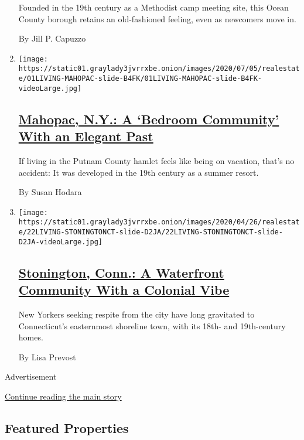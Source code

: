 \begin{enumerate}
  Founded in the 19th century as a Methodist camp meeting site, this
  Ocean County borough retains an old-fashioned feeling, even as
  newcomers move in.

  By Jill P. Capuzzo
\item
  \texttt{[image: https://static01.graylady3jvrrxbe.onion/images/2020/07/05/realestate/01LIVING-MAHOPAC-slide-B4FK/01LIVING-MAHOPAC-slide-B4FK-videoLarge.jpg]}

  \hypertarget{mahopac-ny-a-bedroom-community-with-an-elegant-past}{%
  \subsection{\texorpdfstring{\href{/2020/07/01/realestate/mahopac-ny-a-bedroom-community-with-an-elegant-past.html}{Mahopac,
  N.Y.: A `Bedroom Community' With an Elegant
  Past}}{Mahopac, N.Y.: A `Bedroom Community' With an Elegant Past}}\label{mahopac-ny-a-bedroom-community-with-an-elegant-past}}

  If living in the Putnam County hamlet feels like being on vacation,
  that's no accident: It was developed in the 19th century as a summer
  resort.

  By Susan Hodara
\item
  \texttt{[image: https://static01.graylady3jvrrxbe.onion/images/2020/04/26/realestate/22LIVING-STONINGTONCT-slide-D2JA/22LIVING-STONINGTONCT-slide-D2JA-videoLarge.jpg]}

  \hypertarget{stonington-conn-a-waterfront-community-with-a-colonial-vibe}{%
  \subsection{\texorpdfstring{\href{/2020/04/22/realestate/stonington-conn-a-waterfront-community-with-a-colonial-vibe.html}{Stonington,
  Conn.: A Waterfront Community With a Colonial
  Vibe}}{Stonington, Conn.: A Waterfront Community With a Colonial Vibe}}\label{stonington-conn-a-waterfront-community-with-a-colonial-vibe}}

  New Yorkers seeking respite from the city have long gravitated to
  Connecticut's easternmost shoreline town, with its 18th- and
  19th-century homes.

  By Lisa Prevost
\end{enumerate}

Advertisement

\protect\hyperlink{after-mid2}{Continue reading the main story}

\hypertarget{featured-properties}{%
\subsection{Featured Properties}\label{featured-properties}}

